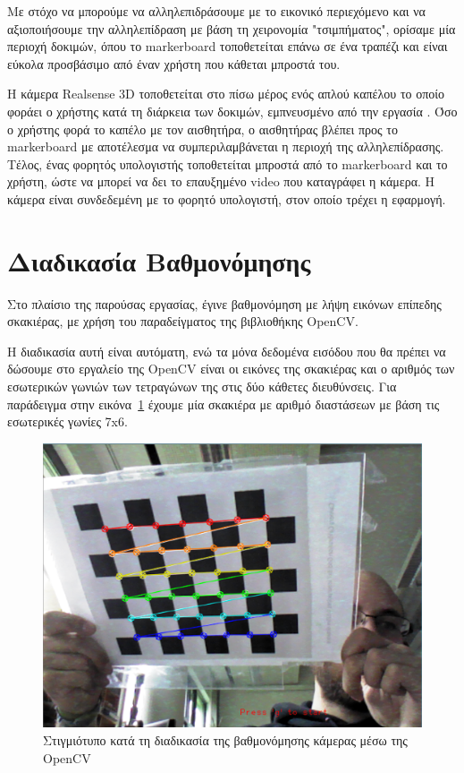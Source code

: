 Με στόχο να μπορούμε να αλληλεπιδράσουμε με το εικονικό περιεχόμενο και να αξιοποιήσουμε την αλληλεπίδραση με βάση τη χειρονομία "τσιμπήματος", ορίσαμε μία περιοχή δοκιμών, όπου το markerboard τοποθετείται επάνω σε ένα τραπέζι και είναι εύκολα προσβάσιμο από έναν χρήστη που κάθεται μπροστά του. 

Η κάμερα Realsense 3D τοποθετείται στο πίσω μέρος ενός απλού καπέλου το οποίο φοράει ο χρήστης κατά τη διάρκεια των δοκιμών, εμπνευσμένο από την εργασία \cite{Mathews2007}. Όσο ο χρήστης φορά το καπέλο με τον αισθητήρα, ο αισθητήρας βλέπει προς το markerboard με αποτέλεσμα να συμπεριλαμβάνεται η περιοχή της αλληλεπίδρασης. Τέλος, ένας φορητός υπολογιστής τοποθετείται μπροστά από το markerboard και το χρήστη, ώστε να μπορεί να δει το επαυξημένο video που καταγράφει η κάμερα. Η κάμερα είναι συνδεδεμένη με το φορητό υπολογιστή, στον οποίο τρέχει η εφαρμογή. 


\section{Διαδικασία Βαθμονόμησης}
Στο πλαίσιο της παρούσας εργασίας, έγινε βαθμονόμηση με λήψη εικόνων επίπεδης σκακιέρας, με χρήση του παραδείγματος της βιβλιοθήκης OpenCV. 

Η διαδικασία αυτή είναι αυτόματη, ενώ τα μόνα δεδομένα εισόδου που θα πρέπει να δώσουμε στο εργαλείο της OpenCV είναι οι εικόνες της σκακιέρας και ο αριθμός των εσωτερικών γωνιών των τετραγώνων της στις δύο κάθετες διευθύνσεις. Για παράδειγμα στην εικόνα~\ref{fig:calibration_screenshot} έχουμε μία σκακιέρα με αριθμό διαστάσεων με βάση τις εσωτερικές γωνίες 7x6.


\begin{figure}[H]
    \centering
    \includegraphics[scale=0.6, angle=0]{Files/Figures/calibration.png}
    \caption[Στιγμιότυπο κατά τη διαδικασία της βαθμονόμησης κάμερας μέσω της OpenCV]{ Στιγμιότυπο κατά τη διαδικασία της βαθμονόμησης κάμερας μέσω της OpenCV}
    \label{fig:calibration_screenshot}
\end{figure}



